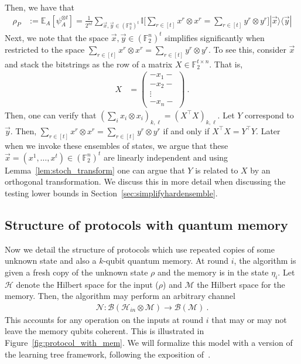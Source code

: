 \documentclass[11pt]{article}
\newcommand{\ketbra}[2]{|#1\rangle\langle#2|}
\newcommand{\id}{\ensuremath{\mathbb{I}}}
\newcommand{\F}{\mathbb{F}}
\newcommand{\Hc}{\mathcal{H}}
\newcommand{\Mc}{\mathcal{M}}
\begin{document}
Then, we have that
\begin{align*}
  \rho_P 
  &:= \mathbb{E}_A [\psi_{A}^{\otimes t}]=\frac{1}{2^{nt}}\sum_{\vec{x},\vec{y}\in (\F_2^{n})^t} \id\Big[\sum_{r\in [t]}x^r\otimes x^r=\sum_{r\in [t]}y^r\otimes y^r\Big]\ketbra{\vec{x}}{\vec{y}}
\end{align*}
Next, we note that the space $\vec{x},\vec{y}\in (\F_2^n)^t$ simplifies significantly when restricted to the space $\sum_{r\in [t]}x^r\otimes x^r=\sum_{r\in [t]}y^r\otimes y^r$. To see this, consider $\vec{x}$ and stack the bitstrings as the row of a matrix $X\in \F_2^{t \times n}$. That is,
\begin{align*}
    X & = \begin{pmatrix}
        -x_1-\\
        -x_2-\\
        \vdots \\
        -x_n-
    \end{pmatrix}\ .
\end{align*}
Then, one can verify that $(\sum_i x_i \otimes x_i)_{k,\ell} = (X^\top X)_{k,\ell}$. Let $Y$ correspond to $\vec{y}$. Then, $\sum_{r\in [t]}x^r\otimes x^r=\sum_{r\in [t]}y^r\otimes y^r$ if and only if $X^\top X = Y^\top Y$. Later when we invoke these ensembles of states, we argue that these $\vec{x}=(x^1,\ldots,x^t)\in (\F_2^n)^t$ are linearly independent and using Lemma~\ref{lem:stoch_transform} one can argue that $Y$ is related to $X$ by an orthogonal transformation. We discuss this in more detail when discussing the testing lower bounds in Section~\ref{sec:simplifyhardensemble}.




\subsection{Structure of protocols with quantum memory}
Now we detail the structure of protocols which use repeated copies of some unknown state and also a $k$-qubit quantum memory. At round $i$, the algorithm is given a fresh copy of the unknown state $\rho$ and the memory is in the state $\eta_i$. Let $\Hc$ denote the Hilbert space for the input ($\rho$) and $\Mc$ the Hilbert space for the memory. Then, the algorithm may perform an arbitrary channel
\begin{align*}
    \mathcal{N}: \mathcal{B}(\mathcal{H}_{in}\otimes \Mc) \rightarrow \mathcal{B}(\Mc)\ .
\end{align*}
This accounts for any operation on the inputs at round $i$ that may or may not leave the memory qubits coherent. This is illustrated in Figure~\ref{fig:protocol_with_mem}. We will formalize this model with a version of the learning tree framework, following the exposition of~\cite{chen2022exponential}.
\end{document}
